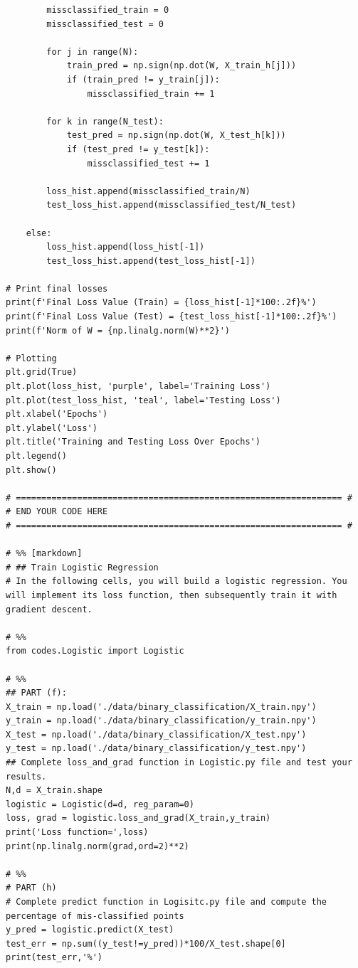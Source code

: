 \documentclass[letterpaper]{article}
\theoremstyle{definition}
\begin{document}
\begin{verbatim}
        missclassified_train = 0
        missclassified_test = 0

        for j in range(N):
            train_pred = np.sign(np.dot(W, X_train_h[j]))
            if (train_pred != y_train[j]):
                missclassified_train += 1

        for k in range(N_test):
            test_pred = np.sign(np.dot(W, X_test_h[k]))
            if (test_pred != y_test[k]):
                missclassified_test += 1

        loss_hist.append(missclassified_train/N)
        test_loss_hist.append(missclassified_test/N_test)

    else:
        loss_hist.append(loss_hist[-1])
        test_loss_hist.append(test_loss_hist[-1])

# Print final losses
print(f'Final Loss Value (Train) = {loss_hist[-1]*100:.2f}%')
print(f'Final Loss Value (Test) = {test_loss_hist[-1]*100:.2f}%')
print(f'Norm of W = {np.linalg.norm(W)**2}')

# Plotting
plt.grid(True)
plt.plot(loss_hist, 'purple', label='Training Loss')
plt.plot(test_loss_hist, 'teal', label='Testing Loss')
plt.xlabel('Epochs')
plt.ylabel('Loss')
plt.title('Training and Testing Loss Over Epochs')
plt.legend()
plt.show()

# ================================================================ #
# END YOUR CODE HERE
# ================================================================ #

# %% [markdown]
# ## Train Logistic Regression
# In the following cells, you will build a logistic regression. You will implement its loss function, then subsequently train it with gradient descent.

# %%
from codes.Logistic import Logistic

# %%
## PART (f): 
X_train = np.load('./data/binary_classification/X_train.npy')
y_train = np.load('./data/binary_classification/y_train.npy')
X_test = np.load('./data/binary_classification/X_test.npy')
y_test = np.load('./data/binary_classification/y_test.npy')
## Complete loss_and_grad function in Logistic.py file and test your results.
N,d = X_train.shape
logistic = Logistic(d=d, reg_param=0)
loss, grad = logistic.loss_and_grad(X_train,y_train)
print('Loss function=',loss)
print(np.linalg.norm(grad,ord=2)**2)

# %%
# PART (h)
# Complete predict function in Logisitc.py file and compute the percentage of mis-classified points
y_pred = logistic.predict(X_test)
test_err = np.sum((y_test!=y_pred))*100/X_test.shape[0]
print(test_err,'%')


\end{verbatim}
\end{document}
